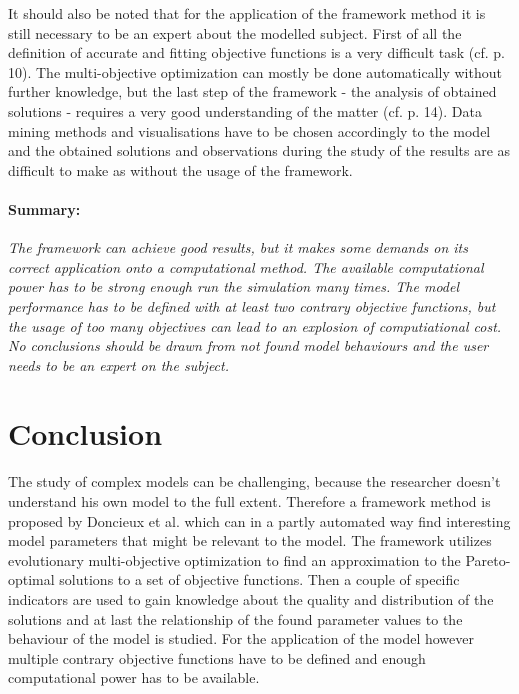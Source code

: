 \documentclass[12pt,twoside]{article}
\theoremstyle{plain}
\theoremstyle{definition}
\theoremstyle{remark}
\begin{document}
It should also be noted that for the application of the framework method it is still necessary to be an expert about the modelled subject.
First of all the definition of accurate and fitting objective functions is a very difficult task (cf. \cite{doncieux2015multi} p. 10). 
The multi-objective optimization can mostly be done automatically without further knowledge, but the last step of the framework - the analysis of obtained solutions - requires a very good understanding of the matter (cf. \cite{doncieux2015multi} p. 14). 
Data mining methods and visualisations have to be chosen accordingly to the model and the obtained solutions and observations during the study of the results are as difficult to make as without the usage of the framework.

\paragraph{Summary:}
\textit{
	The framework can achieve good results, but it makes some demands on its correct application onto a computational method.
	The available computational power has to be strong enough run the simulation many times.
	The model performance has to be defined with at least two contrary objective functions, but the usage of too many objectives can lead to an explosion of computiational cost.
	No conclusions should be drawn from not found model behaviours and the user needs to be an expert on the subject.
}


\section{Conclusion}
\label{sec:concl}

The study of complex models can be challenging, because the researcher doesn't understand his own model to the full extent.
Therefore a framework method is proposed by Doncieux et al. \cite{doncieux2015multi} which can in a partly automated way find interesting model parameters that might be relevant to the model. 
The framework utilizes evolutionary multi-objective optimization to find an approximation to the Pareto-optimal solutions to a set of objective functions.
Then a couple of specific indicators are used to gain knowledge about the quality and distribution of the solutions and at last the relationship of the found parameter values to the behaviour of the model is studied.
For the application of the model however multiple contrary objective functions have to be defined and enough computational power has to be available.\medskip
\end{document}

